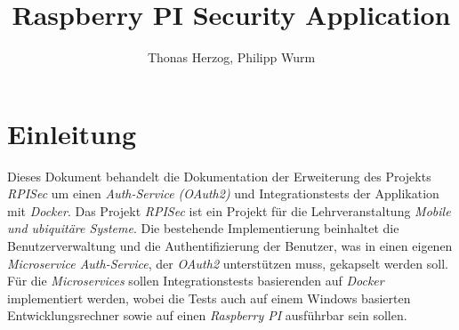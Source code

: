 \documentclass[]{article}
\title{Raspberry PI Security Application}
\author{Thonas Herzog, Philipp Wurm}
\begin{document}
\maketitle

\section{Einleitung}
Dieses Dokument behandelt die Dokumentation der Erweiterung des Projekts \emph{RPISec} um einen \emph{Auth-Service (OAuth2)} und Integrationstests der Applikation mit \emph{Docker}. Das Projekt \emph{RPISec} ist ein Projekt für die Lehrveranstaltung \emph{Mobile und ubiquitäre Systeme}. 
\newline
\newline
Die bestehende Implementierung beinhaltet die Benutzerverwaltung und die Authentifizierung der Benutzer, was in einen eigenen \emph{Microservice Auth-Service}, der \emph{OAuth2} unterstützen muss, gekapselt werden soll. Für die \emph{Microservices} sollen Integrationstests basierenden auf \emph{Docker} implementiert werden, wobei die Tests auch auf einem Windows basierten Entwicklungsrechner sowie auf einen \emph{Raspberry PI} ausführbar sein sollen. 
\end{document}
